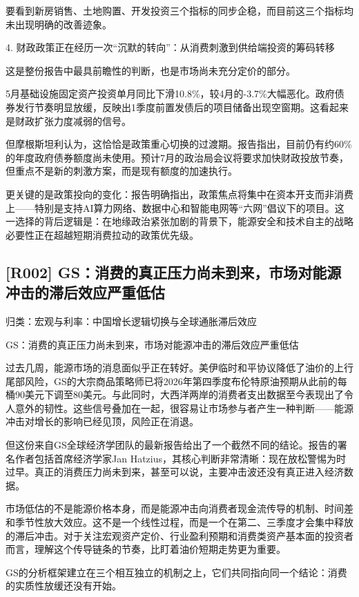 \documentclass[11pt]{ctexart}
\begin{document}
要看到新房销售、土地购置、开发投资三个指标的同步企稳，而目前这三个指标均未出现明确的改善迹象。

4. 财政政策正在经历一次“沉默的转向”：从消费刺激到供给端投资的筹码转移

这是整份报告中最具前瞻性的判断，也是市场尚未充分定价的部分。

5月基础设施固定资产投资单月同比下滑10.8\%，较4月的-3.7\%大幅恶化。政府债券发行节奏明显放缓，反映出1季度前置发债后的项目储备出现空窗期。这看起来是财政扩张力度减弱的信号。

但摩根斯坦利认为，这恰恰是政策重心切换的过渡期。报告指出，目前仍有约60\%的年度政府债券额度尚未使用。预计7月的政治局会议将要求加快财政投放节奏，但重点不是新的刺激方案，而是现有额度的加速执行。

更关键的是政策投向的变化：报告明确指出，政策焦点将集中在资本开支而非消费上——特别是支持AI算力网络、数据中心和智能电网等“六网”倡议下的项目。这一选择的背后逻辑是：在地缘政治紧张加剧的背景下，能源安全和技术自主的战略必要性正在超越短期消费拉动的政策优先级。

\subsection{[R002] GS：消费的真正压力尚未到来，市场对能源冲击的滞后效应严重低估}
{\small\color{refgray}归类：宏观与利率：中国增长逻辑切换与全球通胀滞后效应}

GS：消费的真正压力尚未到来，市场对能源冲击的滞后效应严重低估

过去几周，能源市场的消息面似乎正在转好。美伊临时和平协议降低了油价的上行尾部风险，GS的大宗商品策略师已将2026年第四季度布伦特原油预期从此前的每桶90美元下调至80美元。与此同时，大西洋两岸的消费者支出数据至今表现出了令人意外的韧性。这些信号叠加在一起，很容易让市场参与者产生一种判断——能源冲击对增长的影响已经见顶，风险正在消退。

但这份来自GS全球经济学团队的最新报告给出了一个截然不同的结论。报告的署名作者包括首席经济学家Jan Hatzius，其核心判断非常清晰：现在放松警惕为时过早。真正的消费压力尚未到来，甚至可以说，主要冲击波还没有真正进入经济数据。

市场低估的不是能源价格本身，而是能源冲击向消费者现金流传导的机制、时间差和季节性放大效应。这不是一个线性过程，而是一个在第二、三季度才会集中释放的滞后冲击。对于关注宏观资产定价、行业盈利预期和消费类资产基本面的投资者而言，理解这个传导链条的节奏，比盯着油价短期走势更为重要。

GS的分析框架建立在三个相互独立的机制之上，它们共同指向同一个结论：消费的实质性放缓还没有开始。
\end{document}
